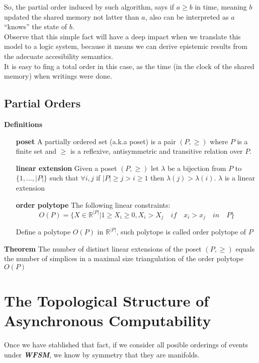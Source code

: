 \documentclass{tufte-book} %
\newcommand{\sh}{\textbf{\textit{WFSM}}\xspace}
\begin{document}
So, the partial order induced by such algorithm, says if $a \ge b$ in time, meaning $b$ updated the shared memory not latter than $a$, also can be interpreted as $a$ ``knows'' the state of $b$. \\
Observe that this simple fact will have a deep impact when we translate this model to a logic system, because it means we can derive epistemic results from the adecuate accesibility semantics.\\
It is easy to fing a total order in this case, as the time (in the clock of the shared memory) when writings were done.

\subsection{Partial Orders}

{\bf Definitions}
\begin{itemize}
\item[{\bf poset}] A partially ordered set (a.k.a poset) is a pair $(P,\ge)$ where $P$ is a finite set and $\ge$ is a reflexive, antisymmetric and transitive relation over $P$.
\item[{\bf linear extension}] Given a poset $(P,\ge)$ let $\lambda$ be a bijection from $P$ to $\{1,...,|P|\}$ such that $\forall i,j$ if $|P| \ge j > i \ge 1$ then $\lambda(j) > \lambda(i)$. $\lambda$ is a linear extension
\item[{\bf order polytope}] The following linear constraints:\\
$$
O(P)=\{X\in \mathbb{R}^{|P|} | 1 \ge X_i \ge 0, X_i > X_j \quad if \quad x_i > x_j \quad in \quad P  \}
$$

Define a polytope $O(P)$ in $ \mathbb{R}^{|P|} $, such polytope is called order polytope of  $P$ \cite{Stanley1986}
\end{itemize}

{\bf Theorem} The number of distinct linear extensions of the poset $(P,\ge)$ equals the number of simplices in a maximal size triangulation of the order polytope $O(P)$ \\

\section{The Topological Structure of Asynchronous Computability}

Once we have stablished that fact, if we consider all posible orderings of events under \sh, we know by symmetry that they are manifolds.\\
\end{document}
